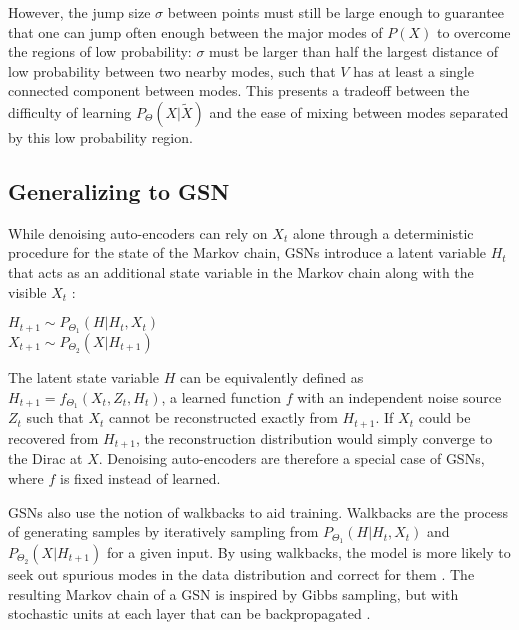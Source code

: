 However, the jump size \(\sigma\) between points must still be large enough to guarantee that one can jump often enough between the major modes of \(P(X)\) to overcome the regions of low probability: \(\sigma\) must be larger than half the largest distance of low probability between two nearby modes, such that \(V\) has at least a single connected component between modes. This presents a tradeoff between the difficulty of learning \(P_{\Theta}(X|\widetilde{X})\) and the ease of mixing between modes separated by this low probability region.


\subsection{Generalizing to GSN}

While denoising auto-encoders can rely on \(X_t\) alone through a deterministic procedure for the state of the Markov chain, GSNs introduce a latent variable \(H_t\) that acts as an additional state variable in the Markov chain along with the visible \(X_t\) \cite{gsn}:

 \(H_{t+1} \sim P_{\Theta_1}(H|H_t, X_t)\)\\
 \(X_{t+1} \sim  P_{\Theta_2}(X|H_{t+1})\)


The latent state variable \(H\) can be equivalently defined as \(H_{t+1} = f_{\Theta_1}(X_t,Z_t,H_t)\), a learned function \(f\) with an independent noise source \(Z_t\) such that \(X_t\) cannot be reconstructed exactly from \(H_{t+1}\). If \(X_t\) could be recovered from \(H_{t+1}\), the reconstruction distribution would simply converge to the Dirac at \(X\). Denoising auto-encoders are therefore a special case of GSNs, where \(f\) is fixed instead of learned.

GSNs also use the notion of walkbacks to aid training. Walkbacks are the process of generating samples by iteratively sampling from \(P_{\Theta_1}(H|H_t, X_t)\) and \(P_{\Theta_2}(X|H_{t+1})\) for a given input. By using walkbacks, the model is more likely to seek out spurious modes in the data distribution and correct for them \cite{bengio13a}. The resulting Markov chain of a GSN is inspired by Gibbs sampling, but with stochastic units at each layer that can be backpropagated \cite{rezende14}.


